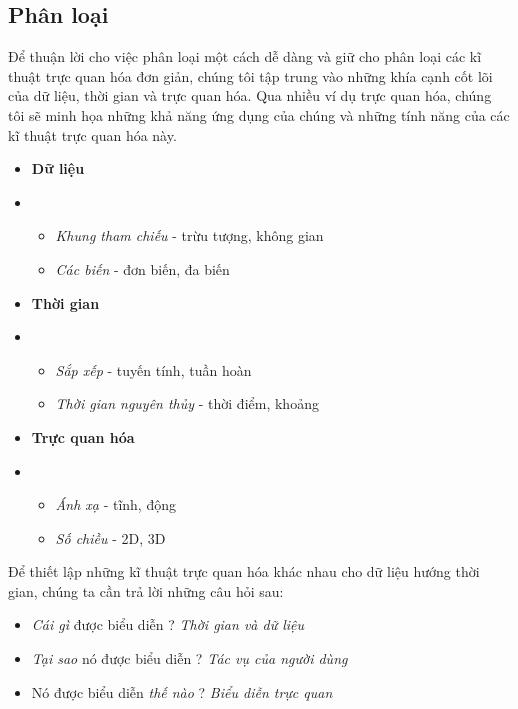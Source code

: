 \subsection{Phân loại}
Để thuận lời cho việc phân loại một cách dễ dàng và giữ cho phân loại các kĩ thuật trực quan hóa đơn giản, chúng tôi tập trung vào những khía cạnh cốt lõi của dữ liệu, thời gian và trực quan hóa. Qua nhiều ví dụ trực quan hóa, chúng tôi sẽ minh họa những khả năng ứng dụng của chúng và những tính năng của các kĩ thuật trực quan hóa này.
\begin{itemize}
    \item \textbf{Dữ liệu} 
    \item[] \begin{itemize}
        \item \textit{Khung tham chiếu} - trừu tượng, không gian
        \item \textit{Các biến} - đơn biến, đa biến
    \end{itemize}
    \item \textbf{Thời gian}
    \item[] \begin{itemize}
        \item \textit{Sắp xếp} - tuyến tính, tuần hoàn
        \item \textit{Thời gian nguyên thủy} - thời điểm, khoảng
    \end{itemize}
    \item \textbf{Trực quan hóa}
    \item[] \begin{itemize}
        \item \textit{Ánh xạ} - tĩnh, động
        \item \textit{Số chiều} - 2D, 3D
    \end{itemize}
\end{itemize}
Để thiết lập những kĩ thuật trực quan hóa khác nhau cho dữ liệu hướng thời gian, chúng ta cần trả lời những câu hỏi sau:
\begin{itemize}
    \item \textit{Cái gì} được biểu diễn ? \textit{Thời gian và dữ liệu}
    \item \textit{Tại sao} nó được biểu diễn ? \textit{Tác vụ của người dùng}
    \item Nó được biểu diễn \textit{thế nào} ? \textit{Biểu diễn trực quan}
\end{itemize}
